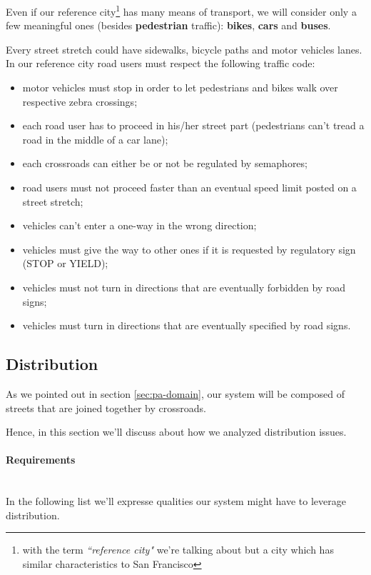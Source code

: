 Even if our reference city\footnote{with the term \emph{``reference city"}
we're talking about but a city which has similar characteristics to San
Francisco} has many means of transport, we will consider only a few meaningful
ones (besides \textbf{pedestrian} traffic): \textbf{bikes}, \textbf{cars} and
\textbf{buses}.

Every street stretch could have sidewalks, bicycle paths and motor vehicles
lanes. In our reference city road users must respect the following traffic
code:

\begin{itemize}
\item motor vehicles must stop in order to let pedestrians and bikes walk over
  respective zebra crossings;
\item each road user has to proceed in his/her street part (pedestrians can't
  tread a road in the middle of a car lane);
\item each crossroads can either be or not be regulated by semaphores;
\item road users must not proceed faster than an eventual speed limit posted
  on a street stretch;
\item vehicles can't enter a one-way in the wrong direction;
\item vehicles must give the way to other ones if it is requested by
  regulatory sign (STOP or YIELD);
\item vehicles must not turn in directions that are eventually forbidden by
  road signs;
\item vehicles must turn in directions that are eventually specified by road
  signs.
\end{itemize}

\subsection{Distribution}
As we pointed out in section \ref{sec:pa-domain}, our system will be composed
of streets that are joined together by crossroads.

Hence, in this section we'll discuss about how we analyzed distribution issues.

\paragraph{Requirements} \mbox{} \\

In the following list we'll expresse qualities our system might have to
leverage distribution.

